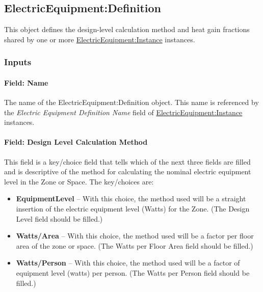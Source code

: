 \subsection{ElectricEquipment:Definition}\label{electricequipmentdefinition}

This object defines the design-level calculation method and heat gain fractions shared by one or more \hyperref[electricequipmentinstance]{ElectricEquipment:Instance} instances.

\subsubsection{Inputs}\label{inputs-3-electricequipmentdefinition}

\paragraph{Field: Name}\label{field-name-electricequipmentdefinition}

The name of the ElectricEquipment:Definition object. This name is referenced by the \textit{Electric Equipment Definition Name} field of \hyperref[electricequipmentinstance]{ElectricEquipment:Instance} instances.

\paragraph{Field: Design Level Calculation Method}\label{field-design-level-calculation-method-1-ee-definition}

This field is a key/choice field that tells which of the next three fields are filled and is descriptive of the method for calculating the nominal electric equipment level in the Zone or Space. The key/choices are:

\begin{itemize}
\tightlist
\item
  \textbf{EquipmentLevel} -- With this choice, the method used will be a straight insertion of the electric equipment level (Watts) for the Zone. (The Design Level field should be filled.)
\item
  \textbf{Watts/Area} -- With this choice, the method used will be a factor per floor area of the zone or space. (The Watts per Floor Area field should be filled.)
\item
  \textbf{Watts/Person} -- With this choice, the method used will be a factor of equipment level (watts) per person. (The Watts per Person field should be filled.)
\end{itemize}


